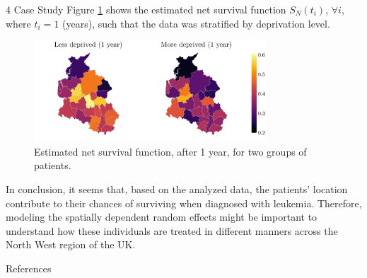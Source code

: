 \documentclass[12pt]{beamer}
\begin{document}
\begin{frame}[t]
\begin{columns}[t]
\begin{column}{0.30\textwidth}
\begin{block}{\Large 4 Case Study}
		Figure \ref{fig:map} shows the estimated net survival function $S_{N}(t_i)$, $\forall i$, where $t_i = 1$ (years), such that the data was stratified by deprivation level.
	
		\begin{figure}[!ht]
			\centering
			\includegraphics[width = 0.775\textwidth]{Images/map_poster}
			\caption{\justifying Estimated net survival function, after 1 year, for two groups of patients.}
			\label{fig:map}
		\end{figure}	
				
		In conclusion, it seems that, based on the analyzed data, the patients' location contribute to their chances of surviving when diagnosed with leukemia. Therefore, modeling the spatially dependent random effects might be important to understand how these individuals are treated in different manners across the North West region of the UK.

		\vspace{18pt}
				
		\end{block}
			
		{\textcolor{title-fg}{References}} \vspace{18pt}
		\scriptsize
		
		
					
		\end{column}
		\end{columns}
	\end{frame}
\end{document}
